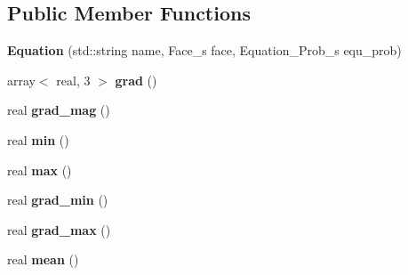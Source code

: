 \subsection*{Public Member Functions}
\begin{DoxyCompactItemize}
\item 
\hypertarget{classEquation_aa828f4c9f7a849e9ae29f2c9491863d6}{{\bfseries Equation} (std\-::string name, Face\-\_\-s face, Equation\-\_\-\-Prob\-\_\-s equ\-\_\-prob)}\label{classEquation_aa828f4c9f7a849e9ae29f2c9491863d6}

\item 
\hypertarget{classEquation_acda03fc82a1a28ab32f127754bf37aea}{array$<$ real, 3 $>$ {\bfseries grad} ()}\label{classEquation_acda03fc82a1a28ab32f127754bf37aea}

\item 
\hypertarget{classEquation_ab67fb5e35d95e74756aed668b072c03f}{real {\bfseries grad\-\_\-mag} ()}\label{classEquation_ab67fb5e35d95e74756aed668b072c03f}

\item 
\hypertarget{classEquation_a629f1ff3c54e7fcfe597c20ab49c773b}{real {\bfseries min} ()}\label{classEquation_a629f1ff3c54e7fcfe597c20ab49c773b}

\item 
\hypertarget{classEquation_a1e95e7d54591e5dc5c68ccca547101c5}{real {\bfseries max} ()}\label{classEquation_a1e95e7d54591e5dc5c68ccca547101c5}

\item 
\hypertarget{classEquation_a3a22bc1a6dd067b6feaf6fc6281a5c1f}{real {\bfseries grad\-\_\-min} ()}\label{classEquation_a3a22bc1a6dd067b6feaf6fc6281a5c1f}

\item 
\hypertarget{classEquation_ae2b284533eda56200c9122846623eb45}{real {\bfseries grad\-\_\-max} ()}\label{classEquation_ae2b284533eda56200c9122846623eb45}

\item 
\hypertarget{classEquation_ae0198edcc6a9a44ed7d88d8279f91cee}{real {\bfseries mean} ()}\label{classEquation_ae0198edcc6a9a44ed7d88d8279f91cee}

\end{DoxyCompactItemize}
